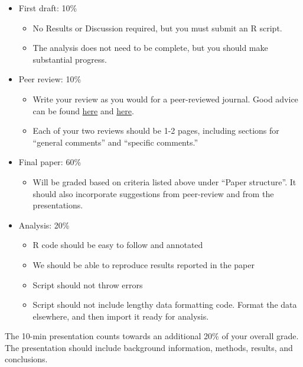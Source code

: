 \documentclass[12pt]{article}
\begin{document}
\begin{itemize}
  \item First draft: 10\%
    \begin{itemize}
      \item No Results or Discussion required, but you must submit an R script.
      \item The analysis does not need to be complete, but you should make substantial progress.
    \end{itemize}
  \item Peer review: 10\%
    \begin{itemize}
      \item Write your review as you would for a peer-reviewed journal. Good advice can be found \textcolor{blue}{\href{https://www.britishecologicalsociety.org/wp-content/uploads/2017/06/BES-Peer-Review-Guide-2017_web.pdf}{here}} and \textcolor{blue}{\href{https://www.nature.com/articles/d41586-018-06991-0}{here}}.
      \item Each of your two reviews should be 1-2 pages, including sections for ``general comments'' and ``specific comments.''
    \end{itemize}
  \item Final paper: 60\%
    \begin{itemize}
      \item Will be graded based on criteria listed above under
        ``Paper structure''. It should also incorporate suggestions from
        peer-review and from the presentations.
    \end{itemize}
  \item Analysis: 20\%
    \begin{itemize}
      \item R code should be easy to follow and annotated
      \item We should be able to reproduce results reported in the paper
      \item Script should not throw errors
      \item Script should not include lengthy data formatting code. Format the data elsewhere, and then import it ready for analysis.
    \end{itemize}
\end{itemize}

The 10-min presentation counts towards an additional 20\% of your
overall grade. The presentation should include background information,
methods, results, and conclusions.   
\end{document}
